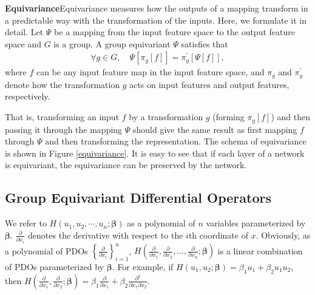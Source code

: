 \documentclass{article}
\begin{document}
\textbf{Equivariance}\quad Equivariance measures how the outputs of a mapping transform in a predictable way with the transformation of the inputs. Here, we formulate it in detail. Let $\Psi$ be a mapping from the input feature space to the output feature space and $G$ is a group. A group equivariant $\Psi$ satisfies that
\begin{align*}
\forall g \in G,\quad \Psi[\pi_g[f]]=\pi^{\prime}_g[\Psi[f]],
\end{align*}
where $f$ can be any input feature map in the input feature space, and $\pi _g$ and $\pi^{\prime}_g$ denote how the transformation $g$ acts on input features and output features, respectively. 

That is, transforming an input $f$ by a transformation $g$ (forming $\pi_g[f]$) and then passing it through the mapping $\Psi$ should give the same result as first mapping $f$ through $\Psi$ and then transforming the representation. The schema of equivariance is shown in Figure \ref{equivariance}. It is easy to see that if each layer of a network is equivariant, the equivariance can be preserved by the network.

\subsection{Group Equivariant Differential Operators}
We refer to $H(u_1,u_2,\cdots,u_n;\bm{\beta})$ as a polynomial of $n$ variables parameterized by $\bm{\beta}$. $\frac{\partial }{\partial x_i}$ denotes the derivative with respect to the $i$th coordinate of $x$. Obviously, as a polynomial of PDOs $\left\{\frac{\partial} {\partial x_i}\right\}_{i=1}^n$, $H(\frac{\partial}{\partial x_1},\frac{\partial}{\partial x_2},\dots,\frac{\partial}{\partial x_n};\bm{\beta})$ is a linear combination of PDOs parameterized by $\bm{\beta}$. For example, if $H(u_1,u_2;\bm{\beta})=\beta_1u_1+\beta_2 u_1u_2$, then $H(\frac{\partial }{\partial x_1},\frac{\partial }{\partial x_2};\bm{\beta})=\beta_1\frac{\partial}{\partial x_1}+\beta_2\frac{\partial^2}{\partial x_1\partial x_2}$. 
\end{document}
